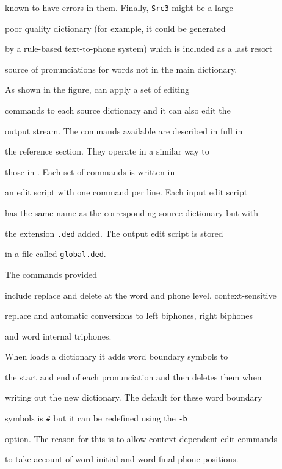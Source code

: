 known to have  errors in them. Finally, \texttt{Src3} might be a large


poor quality dictionary (for example, it could be generated


by a rule-based text-to-phone system) which is included as a last resort


source of pronunciations for words not in the main dictionary.





As shown in the figure,  can apply a set of editing


commands to each source dictionary and it can also edit the


output stream.  The commands available are described in full in


the reference section.  They operate in a similar way to


those in .  Each set of commands is written in


an edit script with one command per line.  Each input edit script


has the same name as the corresponding source dictionary but with


the extension \texttt{.ded} added.  The output edit script is stored


in a file called \texttt{global.ded}.  


The commands provided


include replace and delete at the word and phone level, context-sensitive


replace and automatic conversions to left biphones, right biphones


and word internal triphones.





When  loads a dictionary it adds word boundary symbols to


the start and end of each pronunciation and then deletes them when


writing out the new dictionary.  The default for these word boundary


symbols is \texttt{\#} but it can be redefined using the \texttt{-b}


option.  The reason for this is to allow context-dependent edit commands 


to take account of word-initial and word-final phone positions.  


